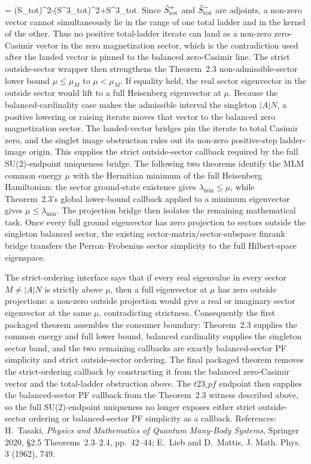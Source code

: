 \documentclass[a4paper,11pt]{article}
\begin{document}
= (\hat S_{\rm tot})^2-(\hat S^3_{\rm tot})^2+\hat S^3_{\rm tot}\).  Since
\(\hat S^+_{\rm tot}\) and \(\hat S^-_{\rm tot}\) are adjoints, a non-zero
vector cannot simultaneously lie in the range of one total ladder and in the
kernel of the other.  Thus no positive total-ladder iterate can land as a
non-zero zero-Casimir vector in the zero magnetization sector, which is the
contradiction used after the landed vector is pinned to the balanced
zero-Casimir line.
The strict outside-sector wrapper then strengthens the Theorem~2.3
non-admissible-sector lower bound \(\mu\le\mu_M\) to \(\mu<\mu_M\).  If
equality held, the real sector eigenvector in the outside sector would lift to
a full Heisenberg eigenvector at \(\mu\).  Because the balanced-cardinality
case makes the admissible interval the singleton \(|A|N\), a positive
lowering or raising iterate moves that vector to the balanced zero
magnetization sector.  The landed-vector bridges pin the iterate to total
Casimir zero, and the singlet image obstruction rules out its non-zero
positive-step ladder-image origin.  This supplies the strict outside-sector
callback required by the full SU(2)-endpoint uniqueness bridge.
The following two theorems
identify the MLM common energy \(\mu\) with the Hermitian minimum of the full
Heisenberg Hamiltonian: the sector ground-state existence gives
\(\lambda_{\min}\le\mu\), while Theorem~2.3's global lower-bound callback
applied to a minimum eigenvector gives \(\mu\le\lambda_{\min}\).  The projection
bridge then isolates the remaining mathematical task.  Once every full ground
eigenvector has zero projection to sectors outside the singleton balanced
sector, the existing sector-matrix/sector-subspace finrank bridge transfers the
Perron--Frobenius sector simplicity to the full Hilbert-space eigenspace.

The strict-ordering interface says that if every real eigenvalue in every
sector \(M\ne |A|N\) is strictly above \(\mu\), then a full eigenvector at
\(\mu\) has zero outside projections: a non-zero outside projection would give
a real or imaginary sector eigenvector at the same \(\mu\), contradicting
strictness.  Consequently the first packaged theorem assembles the consumer
boundary: Theorem~2.3 supplies the common energy and full lower bound, balanced
cardinality supplies the singleton sector band, and the two remaining callbacks
are exactly balanced-sector PF simplicity and strict outside-sector ordering.
The final packaged theorem removes the strict-ordering callback by constructing
it from the balanced zero-Casimir vector and the total-ladder obstruction above.
The \(t23\_pf\) endpoint then supplies the balanced-sector PF callback from the
Theorem~2.3 witness described above, so the full SU(2)-endpoint uniqueness no
longer exposes either strict outside-sector ordering or balanced-sector PF
simplicity as a callback.  References:
H.~Tasaki, \emph{Physics and
Mathematics of Quantum Many-Body Systems}, Springer 2020, §2.5
Theorems~2.3--2.4, pp.~42--44; E.~Lieb and D.~Mattis, J. Math. Phys. 3 (1962),
749.
\end{document}

